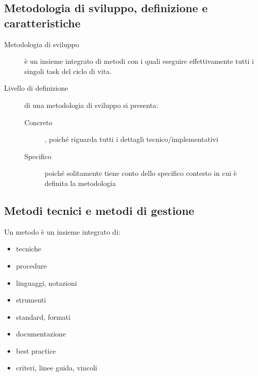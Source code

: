 \subsection{Metodologia di sviluppo, definizione e caratteristiche}
\begin{description}
    \item[Metodologia di sviluppo] è un insieme integrato di metodi con i quali eseguire effettivamente tutti i singoli task del ciclo di vita.
    \item[Livello di definizione] di una metodologia di sviluppo si presenta:
    \begin{description}
        \item[Concreto], poiché riguarda tutti i dettagli tecnico/implementativi
        \item[Specifico] poiché solitamente tiene conto dello specifico contesto in cui è definita la metodologia
    \end{description}
\end{description}
\subsection{Metodi tecnici e metodi di gestione}
Un metodo è un insieme integrato di:
\begin{itemize}
    \item tecniche
    \item procedure
    \item linguaggi, notazioni
    \item strumenti
    \item standard, formati
    \item documentazione
    \item best practice
    \item criteri, linee guida, vincoli
\end{itemize}